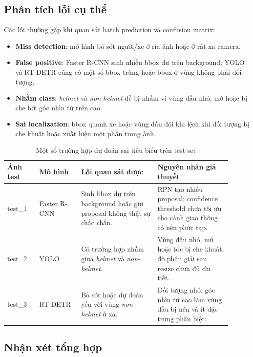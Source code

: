 \subsection{Phân tích lỗi cụ thể}

Các lỗi thường gặp khi quan sát batch prediction và confusion matrix:

\begin{itemize}
    \item \textbf{Miss detection}: mô hình bỏ sót người/xe ở rìa ảnh hoặc ở rất xa camera.
    \item \textbf{False positive}: Faster R-CNN sinh nhiều bbox dư trên background; YOLO và RT-DETR cũng có một số bbox trùng hoặc bbox ở vùng không phải đối tượng.
    \item \textbf{Nhầm class}: \textit{helmet} và \textit{non-helmet} dễ bị nhầm vì vùng đầu nhỏ, mờ hoặc bị che bởi góc nhìn từ trên cao.
    \item \textbf{Sai localization}: bbox quanh xe hoặc vùng đầu đôi khi lệch khi đối tượng bị che khuất hoặc xuất hiện một phần trong ảnh.
\end{itemize}

\begin{table}[H]
    \centering
    \caption{Một số trường hợp dự đoán sai tiêu biểu trên test set}
    \label{tab:error-cases}
    \small
    \begin{tabular}{@{}p{0.13\linewidth} p{0.17\linewidth} p{0.31\linewidth} p{0.30\linewidth}@{}}
        \toprule
        \textbf{Ảnh test} & \textbf{Mô hình} & \textbf{Lỗi quan sát được} & \textbf{Nguyên nhân giả thuyết} \\
        \midrule
        test\_1 & Faster R-CNN & Sinh bbox dư trên background hoặc giữ proposal không thật sự chắc chắn. & RPN tạo nhiều proposal; confidence threshold chưa tối ưu cho cảnh giao thông có nền phức tạp. \\
        test\_2 & YOLO & Có trường hợp nhầm giữa \textit{helmet} và \textit{non-helmet}. & Vùng đầu nhỏ, mũ hoặc tóc bị che khuất, độ phân giải sau resize chưa đủ chi tiết. \\
        test\_3 & RT-DETR & Bỏ sót hoặc dự đoán yếu với vùng \textit{non-helmet} ở xa. & Đối tượng nhỏ, góc nhìn từ cao làm vùng đầu bị nén và ít đặc trưng phân biệt. \\
        \bottomrule
    \end{tabular}
\end{table}

\subsection{Nhận xét tổng hợp}

